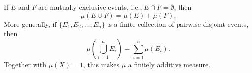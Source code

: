 If $E$ and $F$ are mutually exclusive events, i.e., $E \cap F = \emptyset$, then
$$\mu(E \cup F) = \mu(E) + \mu(F).$$
More generally, if $\{E_1, E_2, \ldots, E_n\}$ is a finite collection of pairwise disjoint events, then
$$\mu\left(\bigcup_{i=1}^{n} E_i\right) = \sum_{i=1}^{n} \mu(E_i).$$
Together with $\mu(X) = 1$, this makes $\mu$ a finitely additive measure.
